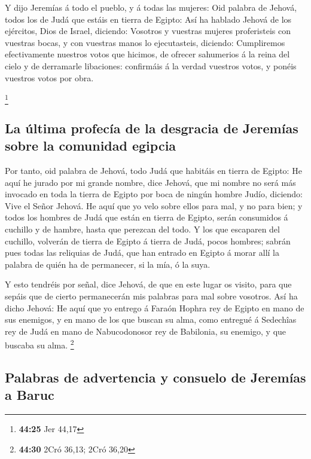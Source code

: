  Y dijo Jeremías á todo el pueblo, y á todas las mujeres:
Oid palabra de Jehová, todos los de Judá que estáis en tierra de Egipto:
 Así ha hablado Jehová de los ejércitos, Dios de Israel,
diciendo: Vosotros y vuestras mujeres proferisteis con vuestras bocas, y
con vuestras manos lo ejecutasteis, diciendo: Cumpliremos efectivamente
nuestros votos que hicimos, de ofrecer sahumerios á la reina del cielo y
de derramarle libaciones: confirmáis á la verdad vuestros votos, y
ponéis vuestros votos por obra.

\footnote{\textbf{44:25} Jer 44,17}

\hypertarget{la-uxfaltima-profecuxeda-de-la-desgracia-de-jeremuxedas-sobre-la-comunidad-egipcia}{%
\subsection{La última profecía de la desgracia de Jeremías sobre la
comunidad
egipcia}\label{la-uxfaltima-profecuxeda-de-la-desgracia-de-jeremuxedas-sobre-la-comunidad-egipcia}}

 Por tanto, oid palabra de Jehová, todo Judá que habitáis
en tierra de Egipto: He aquí he jurado por mi grande nombre, dice
Jehová, que mi nombre no será más invocado en toda la tierra de Egipto
por boca de ningún hombre Judío, diciendo: Vive el Señor Jehová.
 He aquí que yo velo sobre ellos para mal, y no para bien;
y todos los hombres de Judá que están en tierra de Egipto, serán
consumidos á cuchillo y de hambre, hasta que perezcan del todo.
 Y los que escaparen del cuchillo, volverán de tierra de
Egipto á tierra de Judá, pocos hombres; sabrán pues todas las reliquias
de Judá, que han entrado en Egipto á morar allí la palabra de quién ha
de permanecer, si la mía, ó la suya.

 Y esto tendréis por señal, dice Jehová, de que en este
lugar os visito, para que sepáis que de cierto permanecerán mis palabras
para mal sobre vosotros.  Así ha dicho Jehová: He aquí que
yo entrego á Faraón Hophra rey de Egipto en mano de sus enemigos, y en
mano de los que buscan su alma, como entregué á Sedechîas rey de Judá en
mano de Nabucodonosor rey de Babilonia, su enemigo, y que buscaba su
alma. \footnote{\textbf{44:30} 2Cró 36,13; 2Cró 36,20}

\hypertarget{palabras-de-advertencia-y-consuelo-de-jeremuxedas-a-baruc}{%
\subsection{Palabras de advertencia y consuelo de Jeremías a
Baruc}\label{palabras-de-advertencia-y-consuelo-de-jeremuxedas-a-baruc}}

